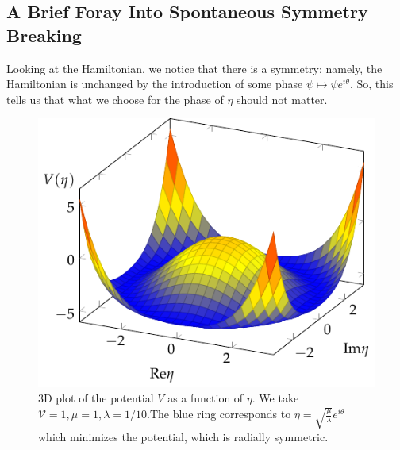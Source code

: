 \subsection{A Brief Foray Into Spontaneous Symmetry Breaking}
Looking at the Hamiltonian, we notice that there is a symmetry; namely, the Hamiltonian is unchanged by the introduction of some phase $\psi \mapsto \psi e^{i\theta}$. So, this tells us that what we choose for the phase of $\eta$ should not matter. 

\begin{figure}[htbp]
    \centering
    \includegraphics[]{Images/fig-etapotential.pdf}
    \caption{3D plot of the potential $V$ as a function of $\eta$. We take $\mathcal{V} = 1, \mu = 1, \lambda = 1/10$.The blue ring corresponds to $\eta = \sqrt{\frac{\mu}{\lambda}}e^{i\theta}$ which minimizes the potential, which is radially symmetric.}
    \label{fig-etapotential}
\end{figure}

